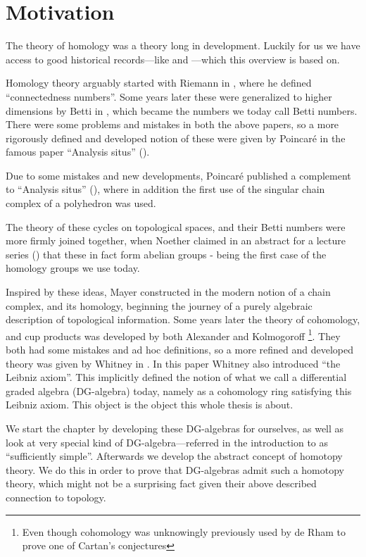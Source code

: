 
\section{Motivation}

The theory of homology was a theory long in development. Luckily for us we have access to good historical records---like \cite{history1} and \cite{history2}---which this overview is based on. 

Homology theory arguably started with Riemann in \cite{riemann}, where he defined ``connectedness numbers''. Some years later these were generalized to higher dimensions by Betti in \cite{betti}, which became the numbers we today call Betti numbers. There were some problems and mistakes in both the above papers, so a more rigorously defined and developed notion of these were given by Poincaré in the famous paper ``Analysis situs'' (\cite{situs}). 

Due to some mistakes and new developments, Poincaré published a complement to ``Analysis situs'' (\cite{situs2}), where in addition the first use of the singular chain complex of a polyhedron was used. 

The theory of these cycles on topological spaces, and their Betti numbers were more firmly joined together, when Noether claimed in an abstract for a lecture series (\cite{noether}) that these in fact form abelian groups - being the first case of the homology groups we use today. 

Inspired by these ideas, Mayer constructed in \cite{mayer, mayer2} the modern notion of a chain complex, and its homology, beginning the journey of a purely algebraic description of topological information. Some years later the theory of cohomology, and cup products was developed by both Alexander and Kolmogoroff \footnote{Even though cohomology was unknowingly previously used by de Rham to prove one of Cartan's conjectures}. They both had some mistakes and ad hoc definitions, so a more refined and developed theory was given by Whitney in \cite{whitney}. In this paper Whitney also introduced ``the Leibniz axiom''. This implicitly defined the notion of what we call a differential graded algebra (DG-algebra) today, namely as a cohomology ring satisfying this Leibniz axiom. This object is the object this whole thesis is about.

We start the chapter by developing these DG-algebras for ourselves, as well as look at very special kind of DG-algebra---referred in the introduction to as ``sufficiently simple''. Afterwards we develop the abstract concept of homotopy theory. We do this in order to prove that DG-algebras admit such a homotopy theory, which might not be a surprising fact given their above described connection to topology. 


